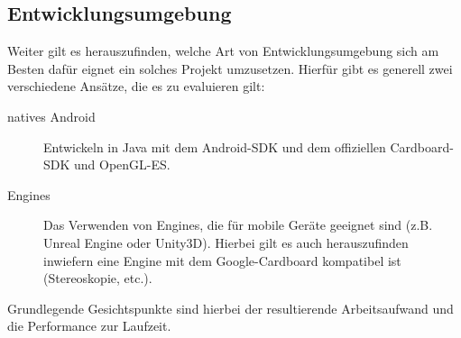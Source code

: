 \documentclass[a4paper]{scrartcl}
\begin{document}
\subsection{Entwicklungsumgebung}
Weiter gilt es herauszufinden, welche Art von Entwicklungsumgebung sich am Besten dafür eignet ein solches Projekt umzusetzen.
Hierfür gibt es generell zwei verschiedene Ansätze, die es zu evaluieren gilt:
\begin{description}
  \item[natives Android]
  Entwickeln in Java mit dem Android-SDK und dem offiziellen Cardboard-SDK und OpenGL-ES.
  \item[Engines]
  Das Verwenden von Engines, die für mobile Geräte geeignet sind (z.B. Unreal Engine oder Unity3D). Hierbei gilt es auch herauszufinden
  inwiefern eine Engine mit dem Google-Cardboard kompatibel ist (Stereoskopie, etc.).
\end{description}
Grundlegende Gesichtspunkte sind hierbei der resultierende Arbeitsaufwand und die Performance zur Laufzeit.
\end{document}
